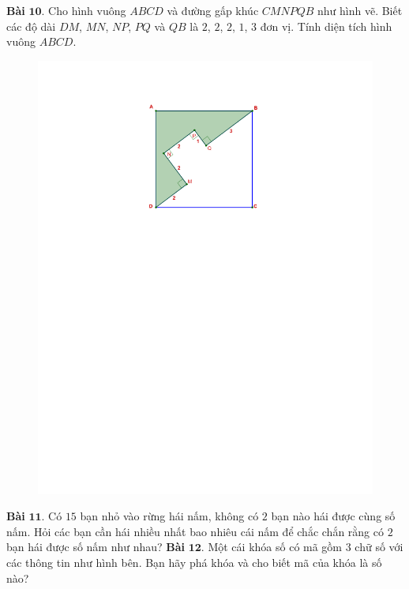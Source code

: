 \begin{multicols}{2}
\begin{figure}[H]
		\vspace*{-10pt}
	\end{figure}
	\textbf{\color{toancuabi}Bài} $\pmb{10.}$ Cho hình vuông $ABCD$ và đường gấp khúc $CMNPQB$ như hình vẽ. Biết các độ dài $DM$, $MN$,
	$NP$, $PQ$ và $QB$ là $2$, $2$, $2$, $1$, $3$ đơn vị. Tính diện tích
	hình vuông $ABCD$.
	\begin{figure}[H]
		\vspace*{-5pt}
		\centering
		\captionsetup{labelformat= empty, justification=centering}
		\includegraphics[width= 0.7\linewidth]{bai10}
		\vspace*{-10pt}
	\end{figure}
	\textbf{\color{toancuabi}Bài} $\pmb{11.}$ Có $15$ bạn nhỏ vào rừng hái nấm, không có $2$ bạn nào hái được cùng số nấm. Hỏi các bạn cần hái nhiều nhất bao nhiêu cái nấm để chắc chắn rằng có $2$ bạn hái được số nấm như nhau?
	\vskip 0.1cm
	\textbf{\color{toancuabi}Bài} $\pmb{12.}$ Một cái khóa số có mã gồm $3$ chữ số với các thông tin như hình bên. Bạn hãy phá khóa và cho biết mã của khóa là số nào?
	\begin{figure}[H]
		\vspace*{-5pt}
		\centering
		\captionsetup{labelformat= empty, justification=centering}

\end{figure}
\end{multicols}
